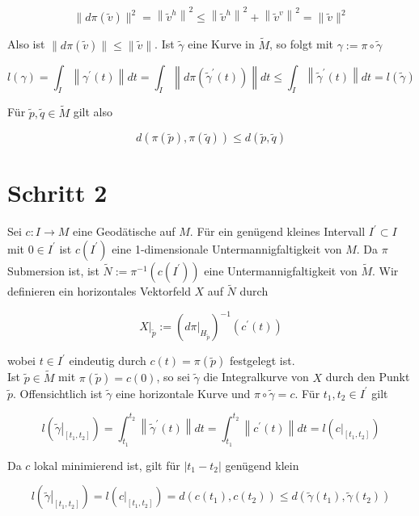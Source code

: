 \documentclass[10pt]{article}
\begin{document}
$$
\|d \pi(\tilde{v})\|^{2}=\left\|\tilde{v}^{h}\right\|^{2} \leq\left\|\tilde{v}^{h}\right\|^{2}+\left\|\tilde{v}^{v}\right\|^{2}=\|\tilde{v}\|^{2}
$$

Also ist $\|d \pi(\tilde{v})\| \leq\|\tilde{v}\|$. Ist $\tilde{\gamma}$ eine Kurve in $\tilde{M}$, so folgt mit $\gamma:=\pi \circ \tilde{\gamma}$

$$
l(\gamma)=\int_{I}\left\|\gamma^{\prime}(t)\right\| d t=\int_{I}\left\|d \pi\left(\tilde{\gamma}^{\prime}(t)\right)\right\| d t \leq \int_{I}\left\|\tilde{\gamma}^{\prime}(t)\right\| d t=l(\tilde{\gamma})
$$

Für $\tilde{p}, \tilde{q} \in \tilde{M}$ gilt also

$$
d(\pi(\tilde{p}), \pi(\tilde{q})) \leq d(\tilde{p}, \tilde{q})
$$

\section*{Schritt 2}
Sei $c: I \rightarrow M$ eine Geodätische auf $M$. Für ein genügend kleines Intervall $I^{\prime} \subset I$ mit $0 \in I^{\prime}$ ist $c\left(I^{\prime}\right)$ eine 1-dimensionale Untermannigfaltigkeit von $M$. Da $\pi$ Submersion ist, ist $\tilde{N}:=\pi^{-1}\left(c\left(I^{\prime}\right)\right)$ eine Untermannigfaltigkeit von $\tilde{M}$. Wir definieren ein horizontales Vektorfeld $X$ auf $\tilde{N}$ durch

$$
\left.X\right|_{\tilde{p}}:=\left(\left.d \pi\right|_{H_{\tilde{p}}}\right)^{-1}\left(c^{\prime}(t)\right)
$$

wobei $t \in I^{\prime}$ eindeutig durch $c(t)=\pi(\tilde{p})$ festgelegt ist.\\
Ist $\tilde{p} \in \tilde{M}$ mit $\pi(\tilde{p})=c(0)$, so sei $\tilde{\gamma}$ die Integralkurve von $X$ durch den Punkt $\tilde{p}$. Offensichtlich ist $\tilde{\gamma}$ eine horizontale Kurve und $\pi \circ \tilde{\gamma}=c$. Für $t_{1}, t_{2} \in I^{\prime}$ gilt

$$
l\left(\left.\tilde{\gamma}\right|_{\left[t_{1}, t_{2}\right]}\right)=\int_{t_{1}}^{t_{2}}\left\|\tilde{\gamma}^{\prime}(t)\right\| d t=\int_{t_{1}}^{t_{2}}\left\|c^{\prime}(t)\right\| d t=l\left(\left.c\right|_{\left[t_{1}, t_{2}\right]}\right)
$$

Da $c$ lokal minimierend ist, gilt für $\left|t_{1}-t_{2}\right|$ genügend klein

$$
l\left(\left.\tilde{\gamma}\right|_{\left[t_{1}, t_{2}\right]}\right)=l\left(\left.c\right|_{\left[t_{1}, t_{2}\right]}\right)=d\left(c\left(t_{1}\right), c\left(t_{2}\right)\right) \leq d\left(\tilde{\gamma}\left(t_{1}\right), \tilde{\gamma}\left(t_{2}\right)\right)
$$
\end{document}
